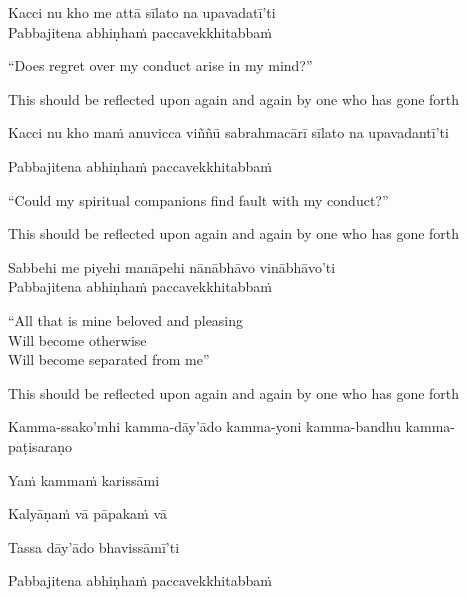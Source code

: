 Kacci nu kho me attā sīlato na upavadatī'ti\\
Pabbajitena abhiṇhaṁ paccavekkhitabbaṁ

\begin{english-verses}
  ``Does regret over my conduct arise in my mind?''
  \begin{english-hang-together-verses}
    This should be reflected upon again and again by one who has gone forth
  \end{english-hang-together-verses}
\end{english-verses}

\begin{pali-hang}
  Kacci nu kho maṁ anuvicca viññū sabrahmacārī sīlato na upavadantī'ti
\end{pali-hang}
\begin{pali-hang-together}
  Pabbajitena abhiṇhaṁ paccavekkhitabbaṁ
\end{pali-hang-together}

\begin{english-verses}
  \begin{english-hang-first-line}
  ``Could my spiritual companions find fault with my conduct?''
  \end{english-hang-first-line}
  \begin{english-hang-together-verses}
    This should be reflected upon again and again by one who has gone forth
  \end{english-hang-together-verses}
\end{english-verses}

Sabbehi me piyehi manāpehi nānābhāvo vinābhāvo'ti\\
Pabbajitena abhiṇhaṁ paccavekkhitabbaṁ

\begin{english-verses}
  ``All that is mine beloved and pleasing\\
  Will become otherwise\\
  Will become separated from me''
  \begin{english-hang-together-verses}
    This should be reflected upon again and again by one who has gone forth
  \end{english-hang-together-verses}
\end{english-verses}

\begin{pali-hang}
  Kamma-ssako'mhi kamma-dāy'ādo kamma-yoni kamma-bandhu kamma-paṭisaraṇo
\end{pali-hang}
\begin{pali-hang-together}
  Yaṁ kammaṁ karissāmi
\end{pali-hang-together}
\begin{pali-hang-together}
  Kalyāṇaṁ vā pāpakaṁ vā
\end{pali-hang-together}
\ifbfiveversion\clearpage\fi
\begin{pali-hang-together}
  Tassa dāy'ādo bhavissāmī'ti
\end{pali-hang-together}
\begin{pali-hang-together}
  Pabbajitena abhiṇhaṁ paccavekkhitabbaṁ
\end{pali-hang-together}


